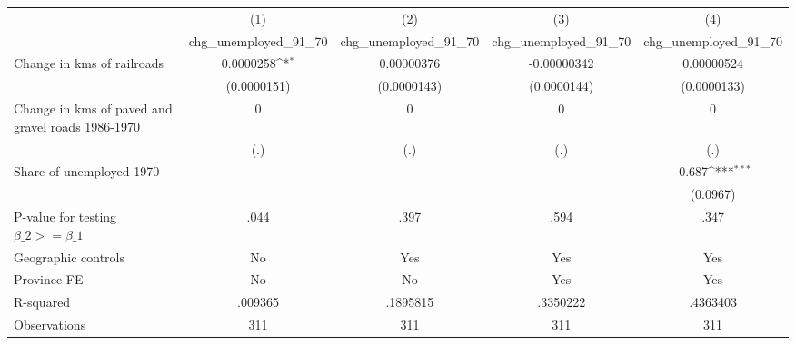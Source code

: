 {
\def\sym#1{\ifmmode^{#1}\else\(^{#1}\)\fi}
\begin{tabular}{l*{4}{c}}
\hline\hline
                &\multicolumn{1}{c}{(1)}&\multicolumn{1}{c}{(2)}&\multicolumn{1}{c}{(3)}&\multicolumn{1}{c}{(4)}\\
                &\multicolumn{1}{c}{chg\_unemployed\_91\_70}&\multicolumn{1}{c}{chg\_unemployed\_91\_70}&\multicolumn{1}{c}{chg\_unemployed\_91\_70}&\multicolumn{1}{c}{chg\_unemployed\_91\_70}\\
\hline
Change in kms of railroads&0.0000258\sym{*}  &0.00000376         &-0.00000342         &0.00000524         \\
                &(0.0000151)         &(0.0000143)         &(0.0000144)         &(0.0000133)         \\
[1em]
Change in kms of paved and gravel roads 1986-1970&        0         &        0         &        0         &        0         \\
                &      (.)         &      (.)         &      (.)         &      (.)         \\
[1em]
Share of unemployed 1970&                  &                  &                  &   -0.687\sym{***}\\
                &                  &                  &                  & (0.0967)         \\
\hline
P-value for testing $\beta\_{2} >= \beta\_{1}$&     .044         &     .397         &     .594         &     .347         \\
Geographic controls&       No         &      Yes         &      Yes         &      Yes         \\
Province FE     &       No         &       No         &      Yes         &      Yes         \\
R-squared       &  .009365         & .1895815         & .3350222         & .4363403         \\
Observations    &      311         &      311         &      311         &      311         \\
\hline\hline
\end{tabular}
}

